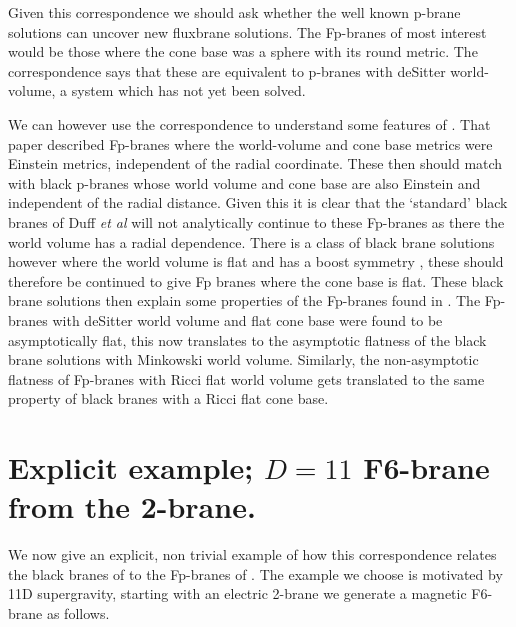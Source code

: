 \documentclass[a4paper,11pt]{article}
\begin{document}
Given this correspondence we should ask whether the well known p-brane
solutions can uncover new fluxbrane solutions. The Fp-branes of most
interest would be those where the cone base was a sphere with its round
metric. The correspondence says that these are equivalent to p-branes
with deSitter world-volume, a system which has not yet been solved.

We can however use the correspondence to understand some features of 
\cite{saffin01}. That paper described Fp-branes where the world-volume
and cone base metrics were Einstein metrics, independent of the radial
coordinate. These then should match with black p-branes whose world volume
and cone base are also Einstein and independent of the radial distance.
Given this it is clear that the `standard' black branes of Duff
{\it et al} \cite{duff96} will not analytically continue to these Fp-branes
as there the world volume has a radial dependence.
There is a class of black brane
solutions however where the
world volume is flat and has a boost symmetry \cite{gregory96}, these should
therefore be continued to give Fp branes where the cone base is flat.
These black brane solutions then explain some properties of the Fp-branes
found in \cite{saffin01}. The Fp-branes with deSitter world volume and
flat cone base were found to be asymptotically flat, this now translates
to the asymptotic flatness of the black brane solutions with Minkowski
world volume. Similarly, the non-asymptotic flatness of Fp-branes with
Ricci flat world volume gets translated to the same property of
black branes with a Ricci flat cone base.

\setcounter{equation}{0}
\section{Explicit example; $D=11$ F6-brane from the 2-brane.}

We now give an explicit, non trivial example of how this correspondence
relates the black branes of \cite{gregory96} to the Fp-branes of
\cite{saffin01}. The example we choose is motivated by 11D supergravity,
starting with
an electric 2-brane we generate a magnetic F6-brane as follows.
\end{document}
